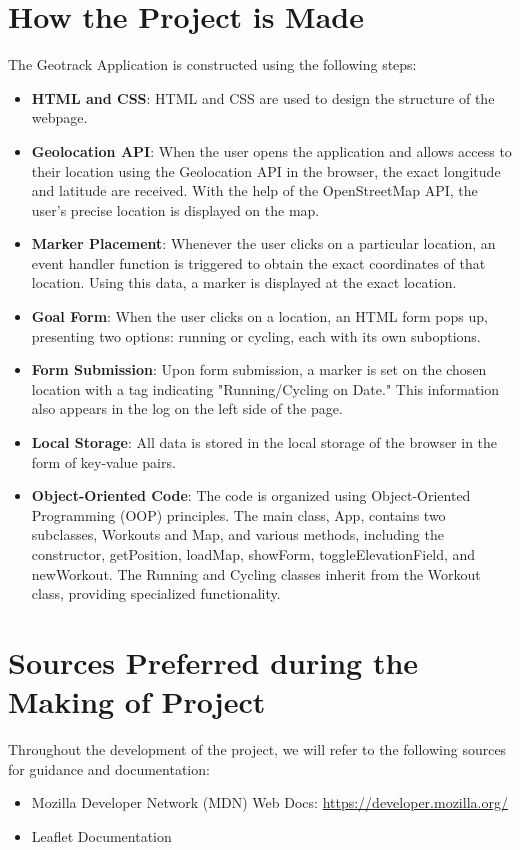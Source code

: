 \documentclass{article}
\begin{document}
\section{How the Project is Made}

The Geotrack Application is constructed using the following steps:

\begin{itemize}
  \item \textbf{HTML and CSS}: HTML and CSS are used to design the structure of the webpage.

  \item \textbf{Geolocation API}: When the user opens the application and allows access to their location using the Geolocation API in the browser, the exact longitude and latitude are received. With the help of the OpenStreetMap API, the user's precise location is displayed on the map.

  \item \textbf{Marker Placement}: Whenever the user clicks on a particular location, an event handler function is triggered to obtain the exact coordinates of that location. Using this data, a marker is displayed at the exact location.

  \item \textbf{Goal Form}: When the user clicks on a location, an HTML form pops up, presenting two options: running or cycling, each with its own suboptions.

  \item \textbf{Form Submission}: Upon form submission, a marker is set on the chosen location with a tag indicating "Running/Cycling on Date." This information also appears in the log on the left side of the page.

  \item \textbf{Local Storage}: All data is stored in the local storage of the browser in the form of key-value pairs.

  \item \textbf{Object-Oriented Code}: The code is organized using Object-Oriented Programming (OOP) principles. The main class, App, contains two subclasses, Workouts and Map, and various methods, including the constructor, getPosition, loadMap, showForm, toggleElevationField, and newWorkout. The Running and Cycling classes inherit from the Workout class, providing specialized functionality.
\end{itemize}

\section{Sources Preferred during the Making of Project}

Throughout the development of the project, we will refer to the following sources for guidance and documentation:

\begin{itemize}
  \item Mozilla Developer Network (MDN) Web Docs: \url{https://developer.mozilla.org/}
  \item Leaflet Documentation
\end{itemize}
\end{document}
